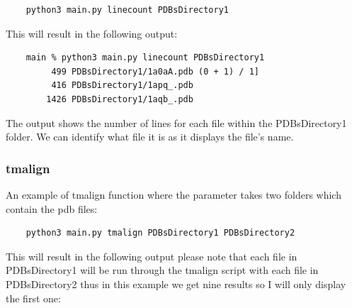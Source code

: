 \documentclass[]{final_report}
\begin{document}
\begin{lstlisting}
    python3 main.py linecount PDBsDirectory1
\end{lstlisting}

This will result in the following output:

\begin{lstlisting}
    main % python3 main.py linecount PDBsDirectory1             
         499 PDBsDirectory1/1a0aA.pdb (0 + 1) / 1]
         416 PDBsDirectory1/1apq_.pdb
        1426 PDBsDirectory1/1aqb_.pdb   
\end{lstlisting}

The output shows the number of lines for each file within the PDBsDirectory1 folder. We can identify what file it is as it displays the file's name.

\clearpage


\subsubsection{tmalign}
An example of tmalign function where the parameter takes two folders which contain the pdb files:

\begin{lstlisting}
    python3 main.py tmalign PDBsDirectory1 PDBsDirectory2
\end{lstlisting}

This will result in the following output please note that each file in PDBsDirectory1 will be run through the tmalign script with each file in PDBsDirectory2 thus in this example we get nine results so I will only display the first one:
\end{document}
